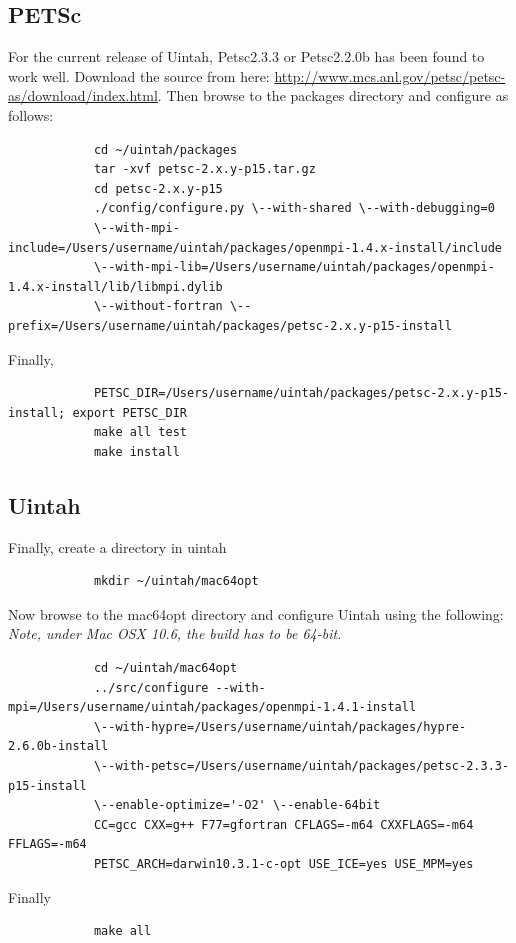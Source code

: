 \documentclass[12pt]{article}
\begin{document}
		\subsection{PETSc}
		For the current release of Uintah, Petsc2.3.3 or Petsc2.2.0b has been found to work well. Download the source from here: \url{http://www.mcs.anl.gov/petsc/petsc-as/download/index.html}.
		Then browse to the packages directory and configure as follows:
		{\small
		\begin{verbatim}
			cd ~/uintah/packages
			tar -xvf petsc-2.x.y-p15.tar.gz
			cd petsc-2.x.y-p15
			./config/configure.py \--with-shared \--with-debugging=0 
			\--with-mpi-include=/Users/username/uintah/packages/openmpi-1.4.x-install/include 
			\--with-mpi-lib=/Users/username/uintah/packages/openmpi-1.4.x-install/lib/libmpi.dylib 
			\--without-fortran \--prefix=/Users/username/uintah/packages/petsc-2.x.y-p15-install
		\end{verbatim}}
		Finally,
		{\small
		\begin{verbatim}
			PETSC_DIR=/Users/username/uintah/packages/petsc-2.x.y-p15-install; export PETSC_DIR
			make all test
			make install
		\end{verbatim}}
		
		\subsection{Uintah}
		Finally, create a directory in uintah
		{\small 
		\begin{verbatim}
			mkdir ~/uintah/mac64opt
		\end{verbatim}} %
		\noindent Now browse to the mac64opt directory and configure Uintah using the following:
		\emph{Note, under Mac OSX 10.6, the build has to be 64-bit.}
		{\small
		\begin{verbatim}
			cd ~/uintah/mac64opt
			../src/configure --with-mpi=/Users/username/uintah/packages/openmpi-1.4.1-install 
			\--with-hypre=/Users/username/uintah/packages/hypre-2.6.0b-install 
			\--with-petsc=/Users/username/uintah/packages/petsc-2.3.3-p15-install 
			\--enable-optimize='-O2' \--enable-64bit 
			CC=gcc CXX=g++ F77=gfortran CFLAGS=-m64 CXXFLAGS=-m64 FFLAGS=-m64
			PETSC_ARCH=darwin10.3.1-c-opt USE_ICE=yes USE_MPM=yes
		\end{verbatim}} %
		\noindent Finally
		{\small
		\begin{verbatim}
			make all
		\end{verbatim}}
\end{document}
